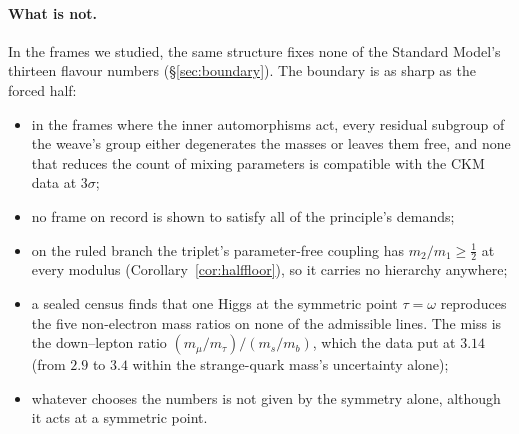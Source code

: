 \paragraph{What is not.}
In the frames we studied, the same structure fixes none of the Standard Model's thirteen flavour numbers (\S\ref{sec:boundary}). The boundary
is as sharp as the forced half:
\begin{itemize}
\item in the frames where the inner automorphisms act, every residual subgroup of the weave's group either degenerates
  the masses or leaves them free, and none that reduces the count of mixing parameters is compatible with the CKM data
  at $3\sigma$;
\item no frame on record is shown to satisfy all of the principle's demands;
\item on the ruled branch the triplet's parameter-free coupling has $m_2/m_1\ge\tfrac12$ at every modulus
  (Corollary~\ref{cor:halffloor}), so it carries no hierarchy anywhere;
\item a sealed census finds that one Higgs at the symmetric point $\tau=\omega$ reproduces the five non-electron mass
  ratios on none of the admissible lines. The miss is the down--lepton ratio $(m_\mu/m_\tau)/(m_s/m_b)$, which the
  data put at $3.14$ (from $2.9$ to $3.4$ within the strange-quark mass's uncertainty alone);
\item whatever chooses the numbers is not given by the symmetry alone, although it acts at a symmetric point.
\end{itemize}

